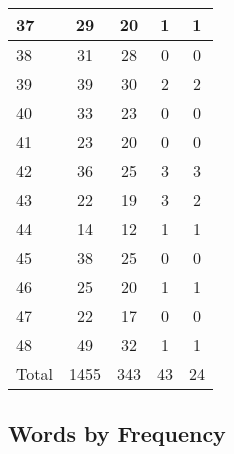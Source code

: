 \begin{center}
\begin{longtable}{l|c|c|c|c}
37 & 29 & 20 & 1 & 1\\ \hline
38 & 31 & 28 & 0 & 0\\ \hline
39 & 39 & 30 & 2 & 2\\ \hline
40 & 33 & 23 & 0 & 0\\ \hline
41 & 23 & 20 & 0 & 0\\ \hline
42 & 36 & 25 & 3 & 3\\ \hline
43 & 22 & 19 & 3 & 2\\ \hline
44 & 14 & 12 & 1 & 1\\ \hline
45 & 38 & 25 & 0 & 0\\ \hline
46 & 25 & 20 & 1 & 1\\ \hline
47 & 22 & 17 & 0 & 0\\ \hline
48 & 49 & 32 & 1 & 1\\ \hline
\hline \hline
Total & 1455 & 343 & 43 & 24



\end{longtable}
\end{center}

 
\subsection{Words by Frequency}

